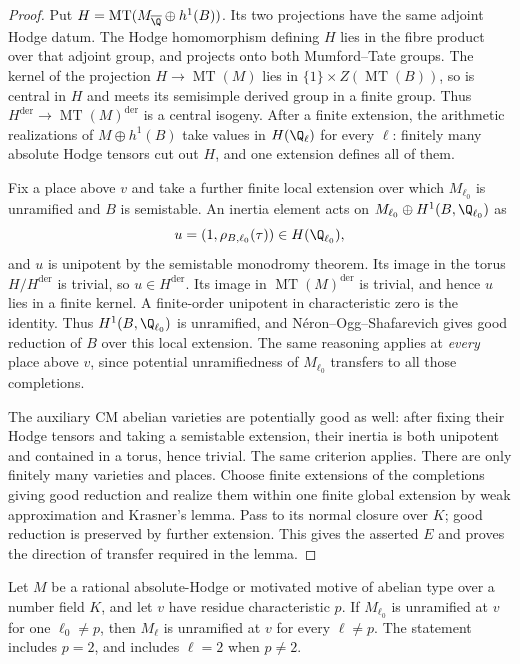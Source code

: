\begin{proof}
Put $H=\operatorname{MT}(M_{\overline\Q}\oplus h^1(B))$.
Its two projections have the same adjoint Hodge datum.  The Hodge
homomorphism defining $H$ lies in the fibre product over that adjoint group,
and projects onto both Mumford--Tate groups.  The kernel of the projection
$H\to\operatorname{MT}(M)$ lies in $\{1\}\times Z(\operatorname{MT}(B))$,
so is central in $H$ and meets its semisimple derived group in a finite
group.  Thus $H^{\mathrm{der}}\to\operatorname{MT}(M)^{\mathrm{der}}$ is a
central isogeny.  After a finite extension, the arithmetic realizations of
$M\oplus h^1(B)$ take values in $H(\Q_\ell)$ for every $\ell$: finitely many
absolute Hodge tensors cut out $H$, and one extension defines all of them.

Fix a place above $v$ and take a further finite local extension over which
$M_{\ell_0}$ is unramified and $B$ is semistable.  An inertia element acts on
$M_{\ell_0}\oplus H^1(B,\Q_{\ell_0})$ as
\[
 u=(1,\rho_{B,\ell_0}(\tau))\in H(\Q_{\ell_0}),
\]
and $u$ is unipotent by the semistable monodromy theorem.  Its image in the
torus $H/H^{\mathrm{der}}$ is trivial, so $u\in H^{\mathrm{der}}$.
Its image in $\operatorname{MT}(M)^{\mathrm{der}}$ is trivial, and hence
$u$ lies in a finite kernel.  A finite-order unipotent in characteristic
zero is the identity.  Thus $H^1(B,\Q_{\ell_0})$ is unramified, and
N\'eron--Ogg--Shafarevich gives good reduction of $B$ over this local
extension.  The same reasoning applies at \emph{every} place above $v$,
since potential unramifiedness of $M_{\ell_0}$ transfers to all those
completions.

The auxiliary CM abelian varieties are potentially good as well: after
fixing their Hodge tensors and taking a semistable extension, their inertia
is both unipotent and contained in a torus, hence trivial.  The same
criterion applies.  There are only finitely many varieties and places.
Choose finite extensions of the completions giving good reduction and
realize them within one finite global extension by weak approximation and
Krasner's lemma.  Pass to its normal closure over $K$; good reduction is
preserved by further extension.  This gives the asserted $E$ and proves
the direction of transfer required in the lemma.
\end{proof}

\begin{theorem}
\label{c:ell-independence-abelian}
Let $M$ be a rational absolute-Hodge or motivated motive of abelian type
over a number field $K$, and let $v$ have residue characteristic $p$.
If $M_{\ell_0}$ is unramified at $v$ for one $\ell_0\ne p$, then
$M_\ell$ is unramified at $v$ for every $\ell\ne p$.
The statement includes $p=2$, and includes $\ell=2$ when $p\ne2$.
\end{theorem}

